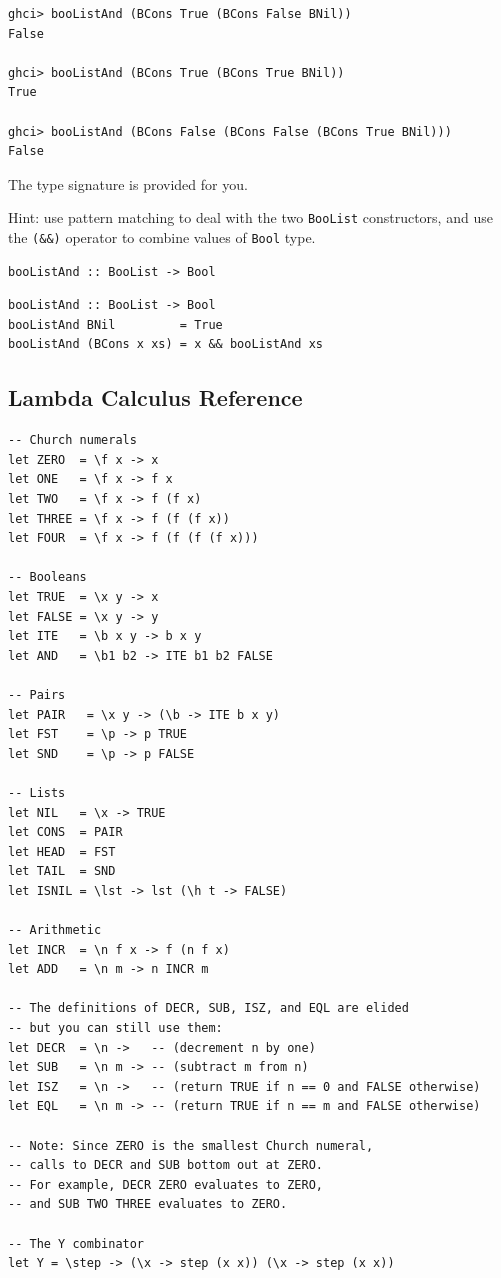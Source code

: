 \documentclass[addpoints]{exam}
\begin{document}
\begin{questions}
\begin{verbatim}
ghci> booListAnd (BCons True (BCons False BNil))
False

ghci> booListAnd (BCons True (BCons True BNil))
True

ghci> booListAnd (BCons False (BCons False (BCons True BNil)))
False
\end{verbatim}

The type signature is provided for you.

Hint: use pattern matching to deal with the two \verb|BooList| constructors, and use the \verb|(&&)| operator to combine values of \verb|Bool| type.

\begin{verbatim}
booListAnd :: BooList -> Bool
\end{verbatim}
\begin{solutionorbox}[3in]
\begin{verbatim}
booListAnd :: BooList -> Bool
booListAnd BNil         = True
booListAnd (BCons x xs) = x && booListAnd xs
\end{verbatim}
\end{solutionorbox}

\end{questions}

\newpage

\subsection*{Lambda Calculus Reference}

\begin{verbatim}
-- Church numerals
let ZERO  = \f x -> x
let ONE   = \f x -> f x
let TWO   = \f x -> f (f x)
let THREE = \f x -> f (f (f x))
let FOUR  = \f x -> f (f (f (f x)))

-- Booleans
let TRUE  = \x y -> x
let FALSE = \x y -> y
let ITE   = \b x y -> b x y
let AND   = \b1 b2 -> ITE b1 b2 FALSE

-- Pairs
let PAIR   = \x y -> (\b -> ITE b x y)
let FST    = \p -> p TRUE
let SND    = \p -> p FALSE

-- Lists
let NIL   = \x -> TRUE
let CONS  = PAIR
let HEAD  = FST
let TAIL  = SND
let ISNIL = \lst -> lst (\h t -> FALSE)

-- Arithmetic
let INCR  = \n f x -> f (n f x)
let ADD   = \n m -> n INCR m

-- The definitions of DECR, SUB, ISZ, and EQL are elided
-- but you can still use them:
let DECR  = \n ->   -- (decrement n by one)
let SUB   = \n m -> -- (subtract m from n)
let ISZ   = \n ->   -- (return TRUE if n == 0 and FALSE otherwise)
let EQL   = \n m -> -- (return TRUE if n == m and FALSE otherwise)

-- Note: Since ZERO is the smallest Church numeral,
-- calls to DECR and SUB bottom out at ZERO.
-- For example, DECR ZERO evaluates to ZERO,
-- and SUB TWO THREE evaluates to ZERO.

-- The Y combinator
let Y = \step -> (\x -> step (x x)) (\x -> step (x x))
\end{verbatim}
\end{document}
